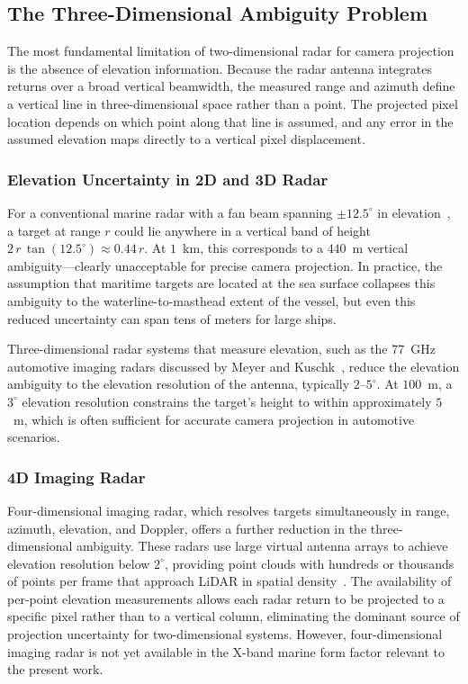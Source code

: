 \subsection{The Three-Dimensional Ambiguity Problem}\label{subsec:3d_ambiguity}

The most fundamental limitation of two-dimensional radar for camera projection is the absence of elevation information. Because the radar antenna integrates returns over a broad vertical beamwidth, the measured range and azimuth define a vertical line in three-dimensional space rather than a point. The projected pixel location depends on which point along that line is assumed, and any error in the assumed elevation maps directly to a vertical pixel displacement.

\subsubsection{Elevation Uncertainty in 2D and 3D Radar}

For a conventional marine radar with a fan beam spanning $\pm 12.5^\circ$ in elevation~\cite{Skolnik2008}, a target at range $r$ could lie anywhere in a vertical band of height $2\,r\,\tan(12.5^\circ) \approx 0.44\,r$. At $1$~km, this corresponds to a $440$~m vertical ambiguity---clearly unacceptable for precise camera projection. In practice, the assumption that maritime targets are located at the sea surface collapses this ambiguity to the waterline-to-masthead extent of the vessel, but even this reduced uncertainty can span tens of meters for large ships.

Three-dimensional radar systems that measure elevation, such as the 77~GHz automotive imaging radars discussed by Meyer and Kuschk~\cite{meyer2019automotive}, reduce the elevation ambiguity to the elevation resolution of the antenna, typically $2$--$5^\circ$. At $100$~m, a $3^\circ$ elevation resolution constrains the target's height to within approximately $5$~m, which is often sufficient for accurate camera projection in automotive scenarios.

\subsubsection{4D Imaging Radar}

Four-dimensional imaging radar, which resolves targets simultaneously in range, azimuth, elevation, and Doppler, offers a further reduction in the three-dimensional ambiguity. These radars use large virtual antenna arrays to achieve elevation resolution below $2^\circ$, providing point clouds with hundreds or thousands of points per frame that approach LiDAR in spatial density~\cite{meyer2019automotive}. The availability of per-point elevation measurements allows each radar return to be projected to a specific pixel rather than to a vertical column, eliminating the dominant source of projection uncertainty for two-dimensional systems. However, four-dimensional imaging radar is not yet available in the X-band marine form factor relevant to the present work.

